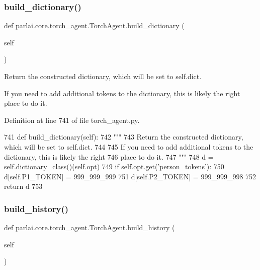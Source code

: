 \subsubsection{\texorpdfstring{build\+\_\+dictionary()}{build\_dictionary()}}
{\footnotesize\ttfamily def parlai.\+core.\+torch\+\_\+agent.\+Torch\+Agent.\+build\+\_\+dictionary (\begin{DoxyParamCaption}\item[{}]{self }\end{DoxyParamCaption})}

\begin{DoxyVerb}Return the constructed dictionary, which will be set to self.dict.

If you need to add additional tokens to the dictionary, this is likely the right
place to do it.
\end{DoxyVerb}
 

Definition at line 741 of file torch\+\_\+agent.\+py.


\begin{DoxyCode}
741     \textcolor{keyword}{def }build\_dictionary(self):
742         \textcolor{stringliteral}{"""}
743 \textcolor{stringliteral}{        Return the constructed dictionary, which will be set to self.dict.}
744 \textcolor{stringliteral}{}
745 \textcolor{stringliteral}{        If you need to add additional tokens to the dictionary, this is likely the right}
746 \textcolor{stringliteral}{        place to do it.}
747 \textcolor{stringliteral}{        """}
748         d = self.dictionary\_class()(self.opt)
749         \textcolor{keywordflow}{if} self.opt.get(\textcolor{stringliteral}{'person\_tokens'}):
750             d[self.P1\_TOKEN] = 999\_999\_999
751             d[self.P2\_TOKEN] = 999\_999\_998
752         \textcolor{keywordflow}{return} d
753 
\end{DoxyCode}
\mbox{\label{classparlai_1_1core_1_1torch__agent_1_1TorchAgent_ab22f61f153b522f429210c61eed2d5af}} 
\subsubsection{\texorpdfstring{build\+\_\+history()}{build\_history()}}
{\footnotesize\ttfamily def parlai.\+core.\+torch\+\_\+agent.\+Torch\+Agent.\+build\+\_\+history (\begin{DoxyParamCaption}\item[{}]{self }\end{DoxyParamCaption})}

